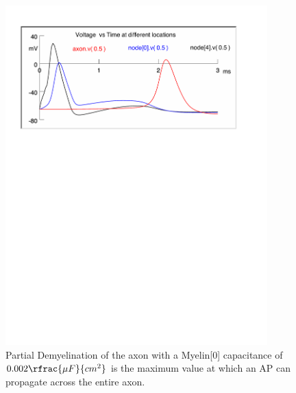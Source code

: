 \documentclass[12pt]{article}
\begin{document}
\begin{figure}[H]
\centering
\includegraphics[width=0.9\textwidth]{Results/4d-002}
\caption{\label{fig:P4d1} Partial Demyelination of the axon with a Myelin[0] capacitance of $0.002 \rfrac{\mu F}{cm^{2}}$ is the maximum value at which an AP can propagate across the entire axon.}
\end{figure}
\end{document}
